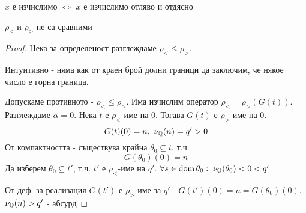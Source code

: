\begin{proposition}
    $x$ е изчислимо $\iff$ $x$ е изчислимо отляво и отдясно
\end{proposition}
\begin{proposition}
    $\rho_<$ и $\rho_>$ не са сравними
\end{proposition}
\begin{proof}
    Нека за определеност разглеждаме $\rho_< \leq \rho_>$.

    Интуитивно - няма как от краен брой долни граници да заключим, че някое число е горна граница.

    Допускаме противното - $\rho_< \leq \rho_>$. Има изчислим оператор $\rho_< = \rho_>(G(t))$. Разглеждаме $\alpha=0$. Нека $t$ е $\rho_<$-име на 0. Тогава $G(t)$ е $\rho_>$-име на 0.
    \begin{equation}
        G(t)(0) = n,\ \nu_{\mathbb{Q}}(n) = q' > 0
    \end{equation}
    От компактността - съществува крайна $\theta_0 \subseteq t$, т.ч. 
    \begin{equation}
        G(\theta_0)(0) = n
    \end{equation}
    Да изберем $\theta_0 \subseteq t'$, т.ч. $t'$ е $\rho_<$-име на $q'$. $\forall s \in \operatorname*{dom}\theta_0:\; \nu_{\mathbb{Q}}(\theta_0) < 0 < q'$

    От деф. за реализация $G(t')$ е $\rho_>$ име за $q'$ - $G(t')(0) = n = G(\theta_0)(0)$. $\nu_{\mathbb{Q}}(n) > q'$ - абсурд 
\end{proof}


